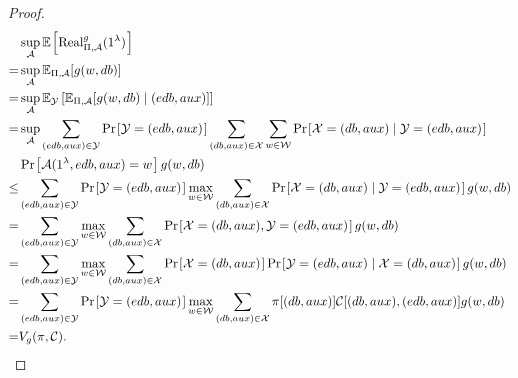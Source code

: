 \begin{proof}
\begin{align}
  & \sup_{\adversary} \expect{\text{Real}_{\Pi, \adversary}^{g}(\secparam)} \label{Proof: g-vulnerability and real, equation 1} \\
= & \sup_{\adversary} \mathbb{E}_{\Pi,\adversary}[g(w, \db)] \label{Proof: g-vulnerability and real, equation 2} \\
= & \sup_{\adversary} \mathbb{E}_{\Y}\left[ \mathbb{E}_{\Pi,\adversary}[g(w, \db) \mid (\edb, \aux)] \right] \label{Proof: g-vulnerability and real, equation 3} \\
= & \sup_{\adversary} \sum_{(\edb, \aux) \in \Y} \prob{\Y = (\edb, \aux)} \sum_{(\db, \aux) \in \X} \sum_{w \in \W} \prob{\X = (\db, \aux) \mid \Y = (\edb, \aux)} \nonumber \\
  & \prob{\adversary(\secparam, \edb, \aux) = w} g(w, \db) \label{Proof: g-vulnerability and real, equation 4} \\
\leq & \sum_{(\edb, \aux) \in \Y} \prob{\Y = (\edb, \aux)} \max_{w \in \W} \sum_{(\db, \aux) \in \X}  \prob{\X = (\db, \aux) \mid \Y = (\edb, \aux)} g(w, \db) \label{Proof: g-vulnerability and real, equation 5} \\
= & \sum_{(\edb, \aux) \in \Y} \max_{w \in \W} \sum_{(\db, \aux) \in \X}  \prob{\X = (\db, \aux), \Y = (\edb, \aux)} g(w, \db) \label{Proof: g-vulnerability and real, equation 6} \\
= & \sum_{(\edb, \aux) \in \Y} \max_{w \in \W} \sum_{(\db, \aux) \in \X} \prob{\X = (\db, \aux)} \prob{\Y = (\edb, \aux) \mid \X = (\db, \aux)} g(w, \db) \label{Proof: g-vulnerability and real, equation 7} \\
= & \sum_{(\edb, \aux) \in \Y} \prob{\Y = (\edb, \aux)} \max_{w \in \W} \sum_{(\db, \aux) \in \X} \pi[(\db, \aux)]  \channel[(\db, \aux), (\edb, \aux)] g(w, \db) \label{Proof: g-vulnerability and real, equation 8} \\
= & V_{g}(\pi, \channel) .
\end{align}


\end{proof}
